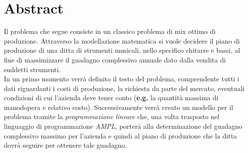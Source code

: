 \newpage
\section{Abstract}
Il problema che segue consiste in un classico problema di mix ottimo di produzione. Attraverso la modellazione matematica si vuole decidere il piano di produzione di una ditta di strumenti musicali, nello specifico chitarre e bassi, al fine di massimizzare il guadagno complessivo annuale dato dalla vendita di suddetti strumenti. \\
In un primo momento verrà definito il testo del problema, comprendente tutti i dati riguardanti i costi di produzione, la richiesta da parte del mercato, eventuali condizioni di cui l'azienda deve tener conto (\textbf{e.g.} la quantità massima di manodopera e relativo costo).
Successivamente verrà creato un modello per il problema tramite la \textit{programmazione lineare} che, una volta trasposto nel linguaggio di programmazione \textit{AMPL}, porterà alla determinazione del guadagno complessivo massimo per l'azienda e quindi al piano di produzione che la ditta dovrà seguire per ottenere tale guadagno.